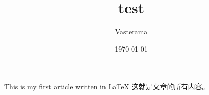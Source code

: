 \documentclass[UTF8]{ctexart}
\title{test}
\author{Vastera\textunderscore ma}
\date{\today}
\begin{document}
 
    \maketitle
    
    This is my first article written in LaTeX
    这就是文章的所有内容。
    ​
    
\end{document}
